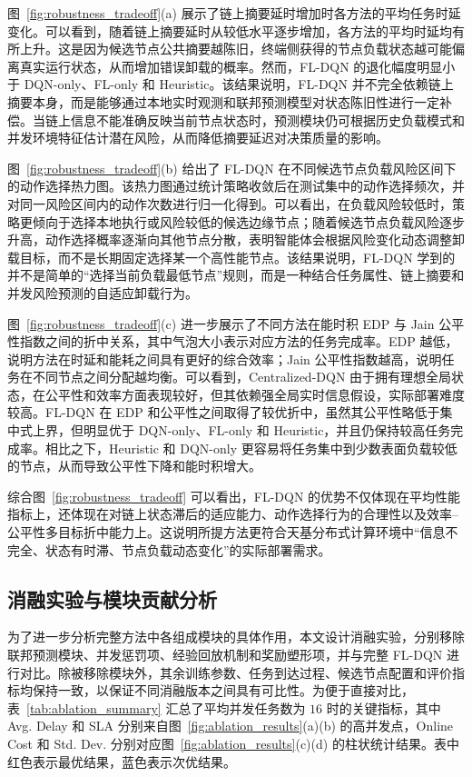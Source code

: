 图~\ref{fig:robustness_tradeoff}(a) 展示了链上摘要延时增加时各方法的平均任务时延变化。可以看到，随着链上摘要延时从较低水平逐步增加，各方法的平均时延均有所上升。这是因为候选节点公共摘要越陈旧，终端侧获得的节点负载状态越可能偏离真实运行状态，从而增加错误卸载的概率。然而，FL-DQN 的退化幅度明显小于 DQN-only、FL-only 和 Heuristic。该结果说明，FL-DQN 并不完全依赖链上摘要本身，而是能够通过本地实时观测和联邦预测模型对状态陈旧性进行一定补偿。当链上信息不能准确反映当前节点状态时，预测模块仍可根据历史负载模式和并发环境特征估计潜在风险，从而降低摘要延迟对决策质量的影响。

图~\ref{fig:robustness_tradeoff}(b) 给出了 FL-DQN 在不同候选节点负载风险区间下的动作选择热力图。该热力图通过统计策略收敛后在测试集中的动作选择频次，并对同一风险区间内的动作次数进行归一化得到。可以看出，在负载风险较低时，策略更倾向于选择本地执行或风险较低的候选边缘节点；随着候选节点负载风险逐步升高，动作选择概率逐渐向其他节点分散，表明智能体会根据风险变化动态调整卸载目标，而不是长期固定选择某一个高性能节点。该结果说明，FL-DQN 学到的并不是简单的“选择当前负载最低节点”规则，而是一种结合任务属性、链上摘要和并发风险预测的自适应卸载行为。

图~\ref{fig:robustness_tradeoff}(c) 进一步展示了不同方法在能时积 EDP 与 Jain 公平性指数之间的折中关系，其中气泡大小表示对应方法的任务完成率。EDP 越低，说明方法在时延和能耗之间具有更好的综合效率；Jain 公平性指数越高，说明任务在不同节点之间分配越均衡。可以看到，Centralized-DQN 由于拥有理想全局状态，在公平性和效率方面表现较好，但其依赖强全局实时信息假设，实际部署难度较高。FL-DQN 在 EDP 和公平性之间取得了较优折中，虽然其公平性略低于集中式上界，但明显优于 DQN-only、FL-only 和 Heuristic，并且仍保持较高任务完成率。相比之下，Heuristic 和 DQN-only 更容易将任务集中到少数表面负载较低的节点，从而导致公平性下降和能时积增大。

综合图~\ref{fig:robustness_tradeoff} 可以看出，FL-DQN 的优势不仅体现在平均性能指标上，还体现在对链上状态滞后的适应能力、动作选择行为的合理性以及效率--公平性多目标折中能力上。这说明所提方法更符合天基分布式计算环境中“信息不完全、状态有时滞、节点负载动态变化”的实际部署需求。

\subsection{消融实验与模块贡献分析}
\label{subsec:ablation_results}

为了进一步分析完整方法中各组成模块的具体作用，本文设计消融实验，分别移除联邦预测模块、并发惩罚项、经验回放机制和奖励塑形项，并与完整 FL-DQN 进行对比。除被移除模块外，其余训练参数、任务到达过程、候选节点配置和评价指标均保持一致，以保证不同消融版本之间具有可比性。为便于直接对比，表~\ref{tab:ablation_summary} 汇总了平均并发任务数为 $16$ 时的关键指标，其中 Avg. Delay 和 SLA 分别来自图~\ref{fig:ablation_results}(a)(b) 的高并发点，Online Cost 和 Std. Dev. 分别对应图~\ref{fig:ablation_results}(c)(d) 的柱状统计结果。表中红色表示最优结果，蓝色表示次优结果。

